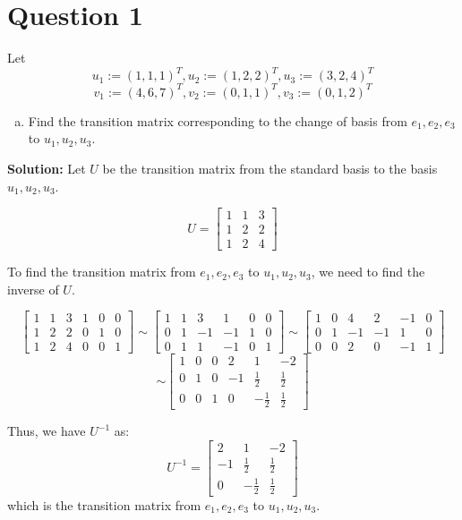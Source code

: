 \documentclass{article}
\begin{document}
\section*{Question 1}
Let
$$ u_1 := (1, 1, 1)^{T}, u_2 := (1, 2, 2)^{T}, u_3 := (3, 2, 4)^{T} $$
$$ v_1 := (4, 6, 7)^{T}, v_2 := (0, 1, 1)^{T}, v_3 := (0, 1, 2)^{T}$$

\begin{enumerate}[(a)]
    \item
    Find the transition matrix corresponding to the change of basis from ${e_1, e_2, e_3}$ to ${u_1, u_2, u_3}$.
\end{enumerate}

\noindent\textbf{Solution:}
Let $U$ be the transition matrix from the standard basis to the basis ${u_1, u_2, u_3}$.

$$ U = \begin{bmatrix} 1 & 1 & 3 \\ 1 & 2 & 2 \\ 1 & 2 & 4 \end{bmatrix} $$

\noindent
To find the transition matrix from ${e_1, e_2, e_3}$ to ${u_1, u_2, u_3}$, we need to find the inverse of $U$.

$$
\left[\begin{array}{ccc|ccc} 1 & 1 & 3 & 1 & 0 & 0 \\ 1 & 2 & 2 & 0 & 1 & 0 \\ 1 & 2 & 4 & 0 & 0 & 1 \end{array}\right] 
\sim 
\left[\begin{array}{ccc|ccc} 1 & 1 & 3 & 1 & 0 & 0 \\ 0 & 1 & -1 & -1 & 1 & 0 \\ 0 & 1 & 1 & -1 & 0 & 1 \end{array}\right]
\sim
\left[\begin{array}{ccc|ccc} 1 & 0 & 4 & 2 & -1 & 0 \\ 0 & 1 & -1 & -1 & 1 & 0 \\ 0 & 0 & 2 & 0 & -1 & 1 \end{array}\right]
$$
$$
\sim
\left[\begin{array}{ccc|ccc} 1 & 0 & 0 & 2 & 1 & -2 \\ 0 & 1 & 0 & -1 & \frac{1}{2} & \frac{1}{2} \\ 0 & 0 & 1 & 0 & -\frac{1}{2} & \frac{1}{2} \end{array}\right]
$$

\noindent
Thus, we have $U^{-1}$ as:
$$ U^{-1} = \begin{bmatrix} 2 & 1 & -2 \\ -1 & \frac{1}{2} & \frac{1}{2} \\ 0 & -\frac{1}{2} & \frac{1}{2} \end{bmatrix} $$
\noindent
which is the transition matrix from ${e_1, e_2, e_3}$ to ${u_1, u_2, u_3}$.
\newline
\end{document}
